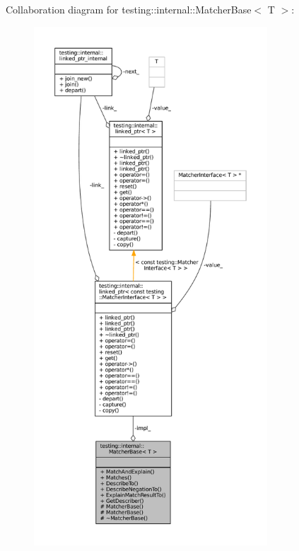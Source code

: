 Collaboration diagram for testing\+:\+:internal\+:\+:Matcher\+Base$<$ T $>$\+:
\nopagebreak
\begin{figure}[H]
\begin{center}
\leavevmode
\includegraphics[height=550pt]{classtesting_1_1internal_1_1MatcherBase__coll__graph}
\end{center}
\end{figure}
